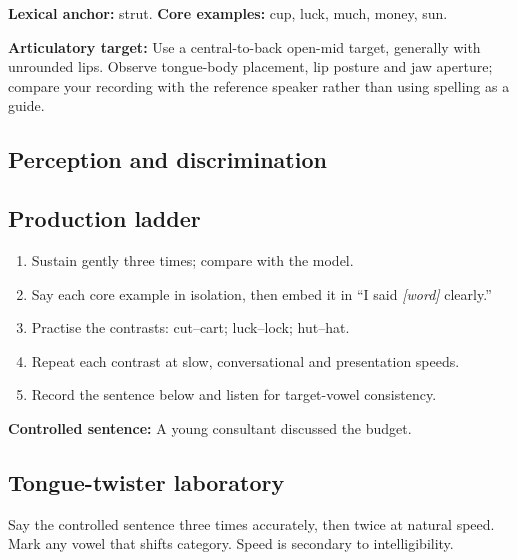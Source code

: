 \textbf{Lexical anchor:} strut. \textbf{Core examples:} cup, luck, much, money, sun.\par
\textbf{Articulatory target:} Use a central-to-back open-mid target, generally with unrounded lips. Observe tongue-body placement, lip posture and jaw aperture; compare your recording with the reference speaker rather than using spelling as a guide.
\subsection{Perception and discrimination}
\subsection{Production ladder}
\begin{enumerate}[label=\arabic*.]
\item Sustain  gently three times; compare with the model.
\item Say each core example in isolation, then embed it in ``I said \emph{[word]} clearly.''
\item Practise the contrasts: cut--cart; luck--lock; hut--hat.
\item Repeat each contrast at slow, conversational and presentation speeds.
\item Record the sentence below and listen for target-vowel consistency.
\end{enumerate}
\textbf{Controlled sentence:} A young consultant discussed the budget.
\subsection{Tongue-twister laboratory}
Say the controlled sentence three times accurately, then twice at natural speed. Mark any vowel that shifts category. Speed is secondary to intelligibility.
